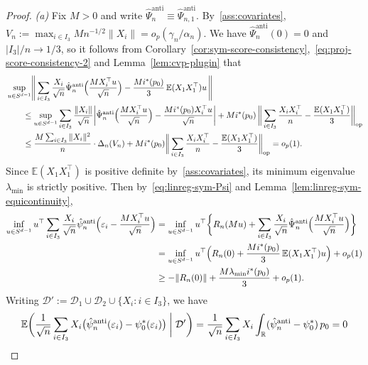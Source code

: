 \documentclass[a4paper]{article}
\newcommand{\R}{\mathbb{R}}
\newcommand{\E}{\mathbb{E}}
\newcommand{\norm}[1]{\|{#1}\|}
\theoremstyle{definition}
\begin{document}
\begin{proof}
\medskip
\noindent \textit{(a)} Fix $M > 0$ and write $\hat{\Psi}_n^{\mathrm{anti}} \equiv \hat{\Psi}_{n,1}^{\mathrm{anti}}$. By~\ref{ass:covariates}, $V_n := \max_{i \in I_3} Mn^{-1/2}\norm{X_i} = o_p(\gamma_n/\alpha_n)$. We have $\hat{\Psi}_n^{\mathrm{anti}}(0) = 0$ and $|I_3|/n \to 1/3$, so it follows from Corollary~\ref{cor:sym-score-consistency},~\eqref{eq:proj-score-consistency-2} and Lemma~\ref{lem:cvp-plugin} that
\begin{align}
&\sup_{u \in S^{d-1}}\Biggl\|\,\sum_{i \in I_3} \frac{X_i}{\sqrt{n}}\hat{\Psi}_n^{\mathrm{anti}}\Bigl(\frac{M X_i^\top u}{\sqrt{n}}\Bigr) - \frac{Mi^*(p_0)}{3}\,\E(X_1 X_1^\top) u\,\Biggr\| \notag \\
&\qquad\leq \sup_{u \in S^{d-1}}\sum_{i \in I_3} \frac{\norm{X_i}}{\sqrt{n}}\biggl|\hat{\Psi}_n^{\mathrm{anti}}\Bigl(\frac{MX_i^\top u}{\sqrt{n}}\Bigr) - \frac{Mi^*(p_0)X_i^\top u}{\sqrt{n}}\biggr| + Mi^*(p_0)\,\biggl\|\,\sum_{i \in I_3}\frac{X_i X_i^\top}{n} - \frac{\E(X_1 X_1^\top)}{3}\biggr\|_{\mathrm{op}}  \notag \\
\label{eq:linreg-sym-Psi}
&\qquad\leq \frac{M\sum_{i \in I_3}\norm{X_i}^2}{n} \cdot \Delta_n(V_n) + Mi^*(p_0)\biggl\|\,\sum_{i \in I_3}\frac{X_i X_i^\top}{n} - \frac{\E(X_1 X_1^\top)}{3}\biggr\|_{\mathrm{op}} = o_p(1).
\end{align}
Since $\E(X_1 X_1^\top)$ is positive definite by~\ref{ass:covariates}, its minimum eigenvalue $\lambda_{\min}$ is strictly positive. Then by~\eqref{eq:linreg-sym-Psi} and Lemma~\ref{lem:linreg-sym-equicontinuity},
\begin{align}
\inf_{u \in S^{d-1}}u^\top \sum_{i \in I_3} \frac{X_i}{\sqrt{n}}\hat{\psi}_n^{\mathrm{anti}}\Bigl(\varepsilon_i - \frac{M X_i^\top u}{\sqrt{n}}\Bigr) &= \inf_{u \in S^{d-1}}u^\top\biggl\{R_n(Mu) + \sum_{i \in I_3} \frac{X_i}{\sqrt{n}}\hat{\Psi}_n^{\mathrm{anti}}\Bigl(\frac{M X_i^\top u}{\sqrt{n}}\Bigr)\biggr\} \notag \\
&= \inf_{u \in S^{d-1}} u^\top\Bigl(R_n(0) + \frac{M i^*(p_0)}{3}\,\E(X_1 X_1^\top)u\Bigr) + o_p(1) \notag \\
\label{eq:linreg-sym-consistency}
&\geq -\norm{R_n(0)} + \frac{M\lambda_{\min}i^*(p_0)}{3} + o_p(1).
\end{align}
Writing $\mathcal{D}' := \mathcal{D}_1 \cup \mathcal{D}_2 \cup \{X_i : i \in I_3\}$, we have 
\[
\E\biggl(\frac{1}{\sqrt{n}}\sum_{i \in I_3} X_i\bigl(\hat{\psi}_n^{\mathrm{anti}}(\varepsilon_i) - \psi_0^*(\varepsilon_i)\bigr) \biggm| \mathcal{D}'\biggr) = \frac{1}{\sqrt{n}}\sum_{i \in I_3} X_i \int_\R (\hat{\psi}_n^{\mathrm{anti}} - \psi_0^*)\,p_0 = 0
\]
\end{proof}
\end{document}
